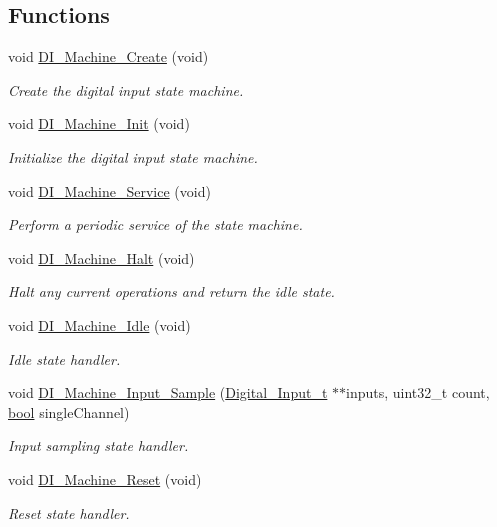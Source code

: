 \subsection*{Functions}
\begin{DoxyCompactItemize}
\item 
void \hyperlink{group__di__statemachine_ga5f2cfe7443234cdadb81a5b221975fa4}{D\-I\-\_\-\-Machine\-\_\-\-Create} (void)
\begin{DoxyCompactList}\small\item\em Create the digital input state machine. \end{DoxyCompactList}\item 
void \hyperlink{group__di__statemachine_gaf2587f28e9c969fde047cd11b6042f2b}{D\-I\-\_\-\-Machine\-\_\-\-Init} (void)
\begin{DoxyCompactList}\small\item\em Initialize the digital input state machine. \end{DoxyCompactList}\item 
void \hyperlink{group__di__statemachine_gaab31cdbb772e1aaadfef389a7e54012f}{D\-I\-\_\-\-Machine\-\_\-\-Service} (void)
\begin{DoxyCompactList}\small\item\em Perform a periodic service of the state machine. \end{DoxyCompactList}\item 
void \hyperlink{group__di__statemachine_ga0e3f0f8603501b5ff86cd5e849d97cad}{D\-I\-\_\-\-Machine\-\_\-\-Halt} (void)
\begin{DoxyCompactList}\small\item\em Halt any current operations and return the idle state. \end{DoxyCompactList}\item 
void \hyperlink{group__di__statemachine_gaa8df31aa65e69cb9e81cdcb11e942001}{D\-I\-\_\-\-Machine\-\_\-\-Idle} (void)
\begin{DoxyCompactList}\small\item\em Idle state handler. \end{DoxyCompactList}\item 
void \hyperlink{group__di__statemachine_gac2e52e7ee418f5ee8301fbf6baecd207}{D\-I\-\_\-\-Machine\-\_\-\-Input\-\_\-\-Sample} (\hyperlink{struct_digital___input__t}{Digital\-\_\-\-Input\-\_\-t} $\ast$$\ast$inputs, uint32\-\_\-t count, \hyperlink{group__data__types_ga0ecf26b576b9a54eca656b9be7ba6a06}{bool} single\-Channel)
\begin{DoxyCompactList}\small\item\em Input sampling state handler. \end{DoxyCompactList}\item 
void \hyperlink{group__di__statemachine_gad16cfcc75eda3999dc6605770b0ea4d7}{D\-I\-\_\-\-Machine\-\_\-\-Reset} (void)
\begin{DoxyCompactList}\small\item\em Reset state handler. \end{DoxyCompactList}\end{DoxyCompactItemize}


